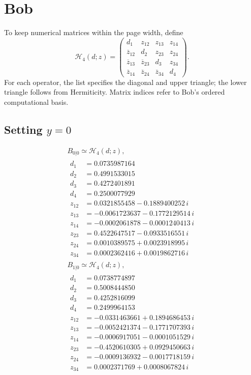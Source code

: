 \documentclass[11pt]{article}
\begin{document}
\section{Bob}
To keep numerical matrices within the page width, define
\[
\mathcal H_4(d;z)=
\begin{pmatrix}
d_1&z_{12}&z_{13}&z_{14}\\
\overline{z}_{12}&d_2&z_{23}&z_{24}\\
\overline{z}_{13}&\overline{z}_{23}&d_3&z_{34}\\
\overline{z}_{14}&\overline{z}_{24}&\overline{z}_{34}&d_4
\end{pmatrix}.
\]
For each operator, the list specifies the diagonal and upper triangle;
the lower triangle follows from Hermiticity. Matrix indices refer to
Bob's ordered computational basis.
\subsection*{Setting $y=0$}
\[
\begin{gathered}
B_{0|0}\simeq\mathcal H_4(d;z),\\[3pt]
\begin{aligned}
d_1&=0.0735987164 \\
d_2&=0.4991533015 \\
d_3&=0.4272401891 \\
d_4&=0.2500077929 \\
z_{12}&=0.0321855458-0.1889400252\,i \\
z_{13}&=-0.0061723637-0.1772129514\,i \\
z_{14}&=-0.0002061878-0.0001240413\,i \\
z_{23}&=0.4522647517-0.0933516551\,i \\
z_{24}&=0.0010389575+0.0023918995\,i \\
z_{34}&=0.0002362416+0.0019862716\,i
\end{aligned}
\end{gathered}
\]
\[
\begin{gathered}
B_{1|0}\simeq\mathcal H_4(d;z),\\[3pt]
\begin{aligned}
d_1&=0.0738774897 \\
d_2&=0.5008444850 \\
d_3&=0.4252816099 \\
d_4&=0.2499964153 \\
z_{12}&=-0.0331463661+0.1894686453\,i \\
z_{13}&=-0.0052421374-0.1771707393\,i \\
z_{14}&=-0.0006917051-0.0001051529\,i \\
z_{23}&=-0.4520610305+0.0929450663\,i \\
z_{24}&=-0.0009136932-0.0017718159\,i \\
z_{34}&=0.0002371769+0.0008067824\,i
\end{aligned}
\end{gathered}
\]
\end{document}
